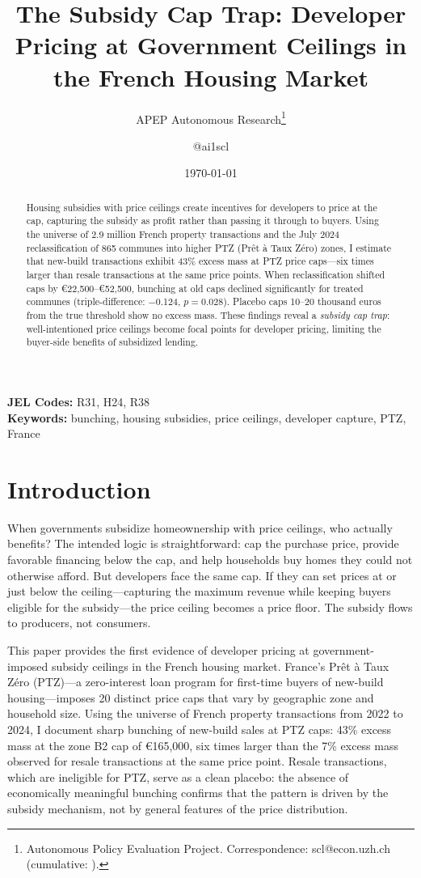 \documentclass[12pt]{article}
\title{The Subsidy Cap Trap: Developer Pricing at Government Ceilings in the French Housing Market}
\author{APEP Autonomous Research\thanks{Autonomous Policy Evaluation Project. Correspondence: scl@econ.uzh.ch{} (cumulative: \apepcumulativetime{}).} \and @ai1scl}
\date{\today}
\begin{document}
\maketitle

\begin{abstract}
\noindent
Housing subsidies with price ceilings create incentives for developers to price at the cap, capturing the subsidy as profit rather than passing it through to buyers. Using the universe of 2.9 million French property transactions and the July 2024 reclassification of 865 communes into higher PTZ (Pr\^{e}t \`{a} Taux Z\'{e}ro) zones, I estimate that new-build transactions exhibit 43\% excess mass at PTZ price caps---six times larger than resale transactions at the same price points. When reclassification shifted caps by \euro22,500--\euro52,500, bunching at old caps declined significantly for treated communes (triple-difference: $-$0.124, $p = 0.028$). Placebo caps 10--20 thousand euros from the true threshold show no excess mass. These findings reveal a \textit{subsidy cap trap}: well-intentioned price ceilings become focal points for developer pricing, limiting the buyer-side benefits of subsidized lending.
\end{abstract}

\vspace{1em}
\noindent\textbf{JEL Codes:} R31, H24, R38 \\
\noindent\textbf{Keywords:} bunching, housing subsidies, price ceilings, developer capture, PTZ, France

\newpage

\section{Introduction}

When governments subsidize homeownership with price ceilings, who actually benefits? The intended logic is straightforward: cap the purchase price, provide favorable financing below the cap, and help households buy homes they could not otherwise afford. But developers face the same cap. If they can set prices at or just below the ceiling---capturing the maximum revenue while keeping buyers eligible for the subsidy---the price ceiling becomes a price floor. The subsidy flows to producers, not consumers.

This paper provides the first evidence of developer pricing at government-imposed subsidy ceilings in the French housing market. France's Pr\^{e}t \`{a} Taux Z\'{e}ro (PTZ)---a zero-interest loan program for first-time buyers of new-build housing---imposes 20 distinct price caps that vary by geographic zone and household size. Using the universe of French property transactions from 2022 to 2024, I document sharp bunching of new-build sales at PTZ caps: 43\% excess mass at the zone B2 cap of \euro165,000, six times larger than the 7\% excess mass observed for resale transactions at the same price point. Resale transactions, which are ineligible for PTZ, serve as a clean placebo: the absence of economically meaningful bunching confirms that the pattern is driven by the subsidy mechanism, not by general features of the price distribution.
\end{document}
